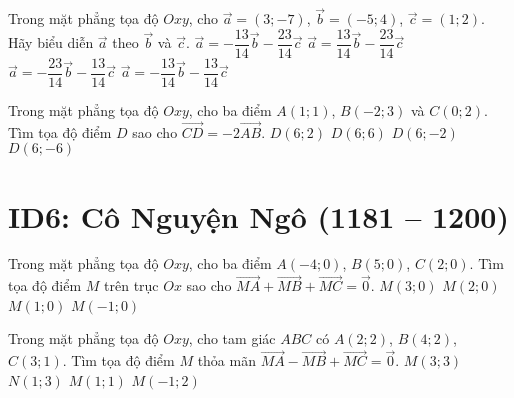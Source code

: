 \begin{ex}%
	Trong mặt phẳng tọa độ $Oxy$, cho $\vec{a}=(3;-7)$, $\vec{b}=(-5;4)$, $\vec{c}=(1;2)$. Hãy biểu diễn $\vec{a}$ theo $\vec{b}$ và $\vec{c}$.
	\choice
	{\True $\vec{a}=-\dfrac{13}{14}\vec{b}-\dfrac{23}{14}\vec{c}$}
	{$\vec{a}=\dfrac{13}{14}\vec{b}-\dfrac{23}{14}\vec{c}$}
	{$\vec{a}=-\dfrac{23}{14}\vec{b}-\dfrac{13}{14}\vec{c}$}
	{$\vec{a}=-\dfrac{13}{14}\vec{b}-\dfrac{13}{14}\vec{c}$}
\end{ex}
\begin{ex}%
	Trong mặt phẳng tọa độ $Oxy$, cho ba điểm $A(1;1)$, $B(-2;3)$ và $C(0;2)$. Tìm tọa độ điểm $D$ sao cho $\vec{CD}=-2\vec{AB}$.
	\choice
	{$D(6;2)$}
	{$D(6;6)$}
	{\True $D(6;-2)$}
	{$D(6;-6)$}
\end{ex}






\section*{ID6: Cô Nguyện Ngô  (1181 -- 1200)}
\begin{ex}%
	Trong mặt phẳng tọa độ $Oxy$, cho ba điểm $A(-4;0)$, $B(5;0)$, $C(2;0)$. Tìm tọa độ điểm $M$ trên trục $Ox$ sao cho $\vec{MA}+\vec{MB}+\vec{MC}=\vec{0}$.
	\choice
	{$M(3;0)$}
	{$M(2;0)$}
	{\True $M(1;0)$}
	{$M(-1;0)$}
\end{ex}


\begin{ex}%
	Trong mặt phẳng tọa độ $Oxy$, cho tam giác $ABC$ có $A(2;2)$, $B(4;2)$, $C(3;1)$. Tìm tọa độ điểm $M$ thỏa mãn $\vec{MA}-\vec{MB}+\vec{MC}=\vec{0}$.
	\choice
	{$M(3;3)$}
	{$N(1;3)$}
	{\True $M(1;1)$}
	{$M(-1;2)$}
\end{ex}

